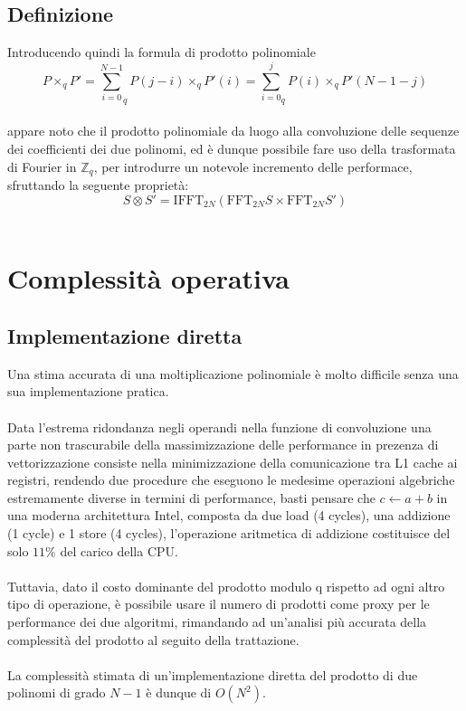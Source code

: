 \subsection{Definizione}
Introducendo quindi la formula di prodotto polinomiale\\
\begin{equation*}
    P {\times}_q P'                                                     =
        {\displaystyle\sum_{i=0}^{N-1}}_q P(j - i) {\times}_q P'(i)     =
        {\displaystyle\sum_{i=0}^{j}}_q P(i) {\times}_q  P'(N - 1 - j)
\end{equation*}
\\
appare noto che il prodotto polinomiale da luogo alla convoluzione delle
sequenze dei coefficienti dei due polinomi, ed è dunque possibile fare uso
della trasformata di Fourier in $\mathbb{Z}_q$, per introdurre un notevole
incremento delle performace, sfruttando la seguente proprietà:
\begin{equation}
    \label{Mulfft}
    S \otimes S' =
    \mathrm{IFFT}_{2N} ( { \mathrm{FFT}_{2N} S \times \mathrm{FFT}_{2N} S' } )
\end{equation}
\pagebreak
\\
\section{Complessità operativa}
\subsection{Implementazione diretta}
Una stima accurata di una moltiplicazione polinomiale è molto difficile senza
una sua implementazione pratica.\\
\\
Data l'estrema ridondanza negli operandi nella funzione di convoluzione una
parte non trascurabile della massimizzazione delle performance in prezenza di
vettorizzazione consiste nella minimizzazione della comunicazione tra L1 cache
ai registri, rendendo due procedure che eseguono le medesime operazioni
algebriche estremamente diverse in termini di performance, basti pensare che
$c \gets a + b$ in una moderna architettura Intel, composta da due load
(4 cycles), una addizione (1 cycle) e 1 store (4 cycles), l'operazione
aritmetica di addizione costituisce del solo $11\%$ del carico della CPU.\\
\\
Tuttavia, dato il costo dominante del prodotto modulo q rispetto ad ogni altro
tipo di operazione, è possibile usare il numero di prodotti come proxy per le
performance dei due algoritmi, rimandando ad un'analisi più accurata della
complessità del prodotto al seguito della trattazione.\\
\\
La complessità stimata di un'implementazione diretta del prodotto di due
polinomi di grado $N-1$ è dunque di $O(N^2)$.\\
\pagebreak
